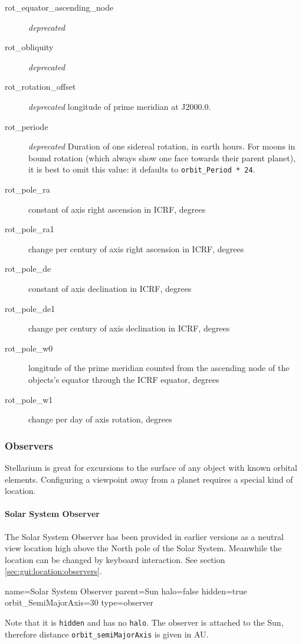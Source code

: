 \begin{description}
  \item[rot\_equator\_ascending\_node] \emph{deprecated}
  \item[rot\_obliquity] \emph{deprecated}
  \item[rot\_rotation\_offset] \emph{deprecated} longitude of prime meridian at J2000.0. 
  \item[rot\_periode]  \emph{deprecated}  Duration of one sidereal rotation, in earth hours. For moons in bound rotation 
       (which always show one face towards their parent planet), it is best to omit this value: it defaults to \texttt{orbit\_Period * 24}. 

  \item[rot\_pole\_ra]  constant of axis right ascension in ICRF, degrees
  \item[rot\_pole\_ra1] change per century of axis right ascension in ICRF, degrees
  \item[rot\_pole\_de] constant of axis declination in ICRF, degrees
  \item[rot\_pole\_de1] change per century of axis declination in ICRF, degrees
  \item[rot\_pole\_w0] longitude of the prime meridian counted from the
    ascending node of the objects's equator through the ICRF equator, degrees
  \item[rot\_pole\_w1] change per day of axis rotation, degrees  
\end{description}



\subsubsection{Observers}
\label{sec:ssystem.ini:Observers}

Stellarium is great for excursions to the surface of any object with
known orbital elements.  Configuring a viewpoint away from a planet
requires a special kind of location.

\paragraph{Solar System Observer}
\label{sec:ssystem.ini:SolarSystemObserver}

The Solar System Observer has
been provided in earlier versions as a neutral view location high above the North pole of
the Solar System. Meanwhile  the location can be changed by keyboard interaction. See section \ref{sec:gui:location:observers}.
\begin{configfile}
name=Solar System Observer
parent=Sun
halo=false
hidden=true
orbit_SemiMajorAxis=30
type=observer
\end{configfile}
Note that it is \texttt{hidden} and has no \texttt{halo}. 
The observer is attached to the Sun, therefore distance \texttt{orbit\_semiMajorAxis} is given in AU.

